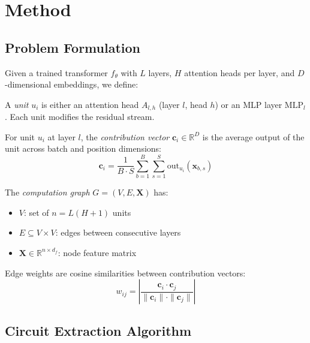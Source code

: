 \documentclass[11pt]{article}
\begin{document}
\section{Method}

\subsection{Problem Formulation}

Given a trained transformer $f_\theta$ with $L$ layers, $H$ attention heads per layer, and $D$-dimensional embeddings, we define:

\begin{definition}
A \emph{unit} $u_i$ is either an attention head $A_{l,h}$ (layer $l$, head $h$) or an MLP layer $\text{MLP}_l$. Each unit modifies the residual stream.
\end{definition}

\begin{definition}
For unit $u_i$ at layer $l$, the \emph{contribution vector} $\mathbf{c}_i \in \mathbb{R}^D$ is the average output of the unit across batch and position dimensions:
\begin{equation}
\mathbf{c}_i = \frac{1}{B \cdot S} \sum_{b=1}^{B} \sum_{s=1}^{S} \text{out}_{u_i}(\mathbf{x}_{b,s})
\end{equation}
\end{definition}

\begin{definition}
The \emph{computation graph} $G = (V, E, \mathbf{X})$ has:
\begin{itemize}
    \item $V$: set of $n = L(H+1)$ units
    \item $E \subseteq V \times V$: edges between consecutive layers
    \item $\mathbf{X} \in \mathbb{R}^{n \times d_f}$: node feature matrix
\end{itemize}
Edge weights are cosine similarities between contribution vectors:
\begin{equation}
w_{ij} = \left|\frac{\mathbf{c}_i \cdot \mathbf{c}_j}{\|\mathbf{c}_i\| \cdot \|\mathbf{c}_j\|}\right|
\end{equation}
\end{definition}

\subsection{Circuit Extraction Algorithm}
\end{document}
